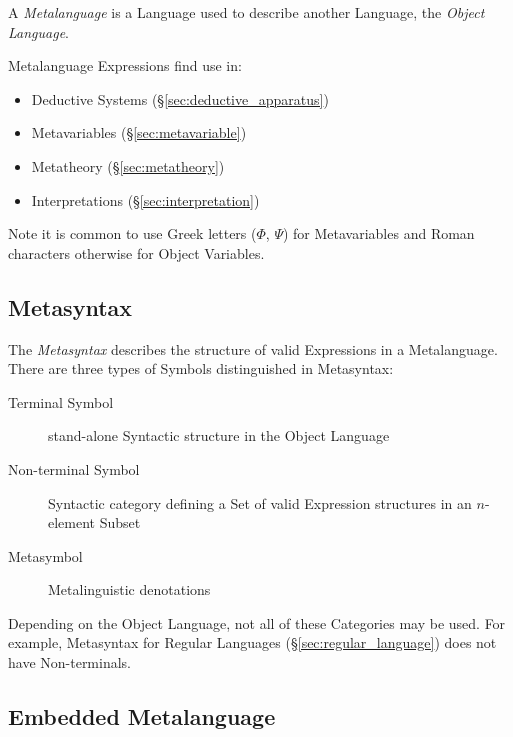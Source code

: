 A \emph{Metalanguage} is a Language used to describe another Language,
the \emph{Object Language}.

Metalanguage Expressions find use in:
\begin{itemize}
  \item Deductive Systems (\S\ref{sec:deductive_apparatus})
  \item Metavariables (\S\ref{sec:metavariable})
  \item Metatheory (\S\ref{sec:metatheory})
  \item Interpretations (\S\ref{sec:interpretation})
\end{itemize}

Note it is common to use Greek letters ($\Phi$, $\Psi$) for
Metavariables and Roman characters otherwise for Object Variables.



\subsection{Metasyntax}\label{sec:metasyntax}

The \emph{Metasyntax} describes the structure of valid Expressions in
a Metalanguage. There are three types of Symbols distinguished in
Metasyntax:
\begin{description}
  \item [Terminal Symbol] stand-alone Syntactic structure in the
    Object Language
  \item [Non-terminal Symbol] Syntactic category defining a Set of
    valid Expression structures in an $n$-element Subset
  \item [Metasymbol] Metalinguistic denotations
\end{description}
Depending on the Object Language, not all of these Categories may be
used. For example, Metasyntax for Regular Languages
(\S\ref{sec:regular_language}) does not have Non-terminals.



\subsection{Embedded Metalanguage}\label{sec:embedded_metalanguage}

